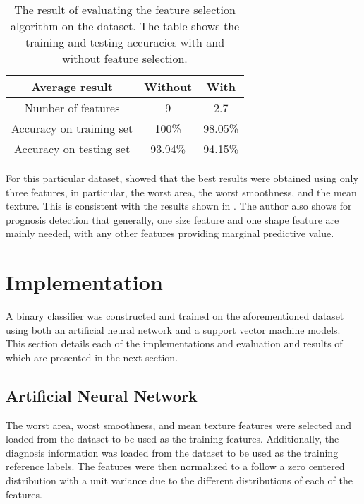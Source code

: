 \documentclass[twocolumn]{article}
\begin{document}
\begin{table}
\begin{center}
\begin{tabular}{ccc}
\toprule
Average result & Without & With \\
\midrule
Number of features & 9 & 2.7 \\
Accuracy on training set & 100\% & 98.05\% \\
Accuracy on testing set & 93.94\% & 94.15\% \\
\bottomrule
\end{tabular}
\end{center}
\caption{The result of evaluating the feature selection algorithm on the
  dataset. The table shows the training and testing accuracies with and without
  feature selection.}
\label{tab:FeatureSelectionAccuracy}
\end{table}

For this particular dataset, \autocite{Mandelbrot1982} showed that the best
results were obtained using only three features, in particular, the worst area,
the worst smoothness, and the mean texture. This is consistent with the results
shown in . The author also shows for
prognosis detection that generally, one size feature and one shape feature are
mainly needed, with any other features providing marginal predictive value.

\section{Implementation}
\label{sec:Implementation}

A binary classifier was constructed and trained on the aforementioned dataset
using both an artificial neural network and a support vector machine models.
This section details each of the implementations and evaluation and results of
which are presented in the next section.

\subsection{Artificial Neural Network}

The worst area, worst smoothness, and mean texture features were selected and
loaded from the dataset to be used as the training features. Additionally, the
diagnosis information was loaded from the dataset to be used as the training
reference labels. The features were then normalized to a follow a zero centered
distribution with a unit variance due to the different distributions of each of
the features.
\end{document}
